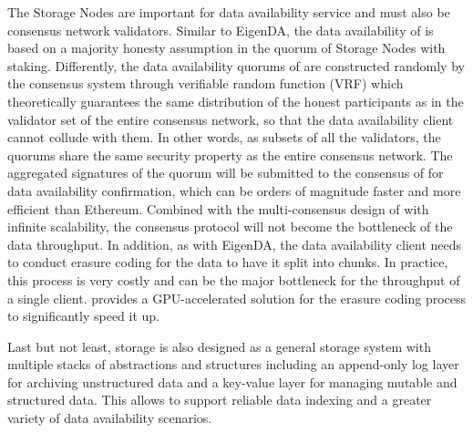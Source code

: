 The Storage Nodes are important for \projabbrev data availability service and must also be consensus network validators. Similar to EigenDA, the data availability of \projabbrev is based on a majority honesty assumption in the quorum of Storage Nodes with staking. Differently, the data availability quorums of \projabbrev are constructed randomly by the consensus system through verifiable random function (VRF) which theoretically guarantees the same distribution of the honest participants as in the validator set of the entire consensus network, so that the data availability client cannot collude with them.
In other words, as subsets of all the validators, the quorums share the same security property as the entire consensus network.
The aggregated signatures of the quorum will be submitted to the consensus of \projabbrev for data availability confirmation, which can be orders of magnitude faster and more efficient than Ethereum. 
Combined with the multi-consensus design of \projabbrev with infinite scalability, the consensus protocol will not become the bottleneck of the data throughput.
In addition, as with EigenDA, the data availability client needs to conduct erasure coding for the data to have it split into chunks. In practice, this process is very costly and can be the major bottleneck for the throughput of a single client. \projabbrev provides a GPU-accelerated solution for the erasure coding process to significantly speed it up.   
 

Last but not least, \projabbrev storage is also designed as a general storage system with multiple stacks of abstractions and structures including an append-only log layer for archiving unstructured data and a key-value layer for managing mutable and structured data. This allows \projabbrev to support reliable data indexing and a greater variety of data availability scenarios.  




 


